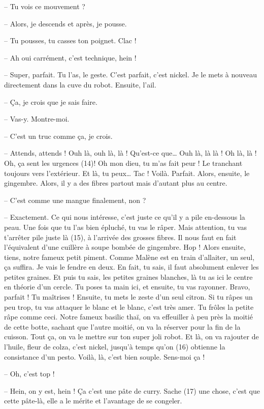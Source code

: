 \documentclass[11pt, french]{report}
\begin{document}
-- Tu vois ce mouvement ?

-- Alors, je descends et après, je pousse.

-- Tu pousses, tu casses ton poignet. Clac !

-- Ah oui carrément, c’est technique, hein !

-- Super, parfait. Tu l’as, le geste. C’est parfait, c’est nickel. Je le mets
à nouveau directement dans la cuve du robot. Ensuite, l’ail.

-- Ça, je crois que je sais faire.

-- Vas-y. Montre-moi.

-- C’est un truc comme ça, je crois.

-- Attends, attends ! Ouh là, ouh là, là ! Qu’est-ce que… Ouh là, là là !
Oh là, là ! Oh, ça sent les urgences (14)! Oh mon dieu, tu m’as fait peur !
Le tranchant toujours vers l’extérieur. Et là, tu peux… Tac ! Voilà. Parfait.
Alors, ensuite, le gingembre. Alors, il y a des fibres partout mais d’autant
plus au centre.

-- C’est comme une mangue finalement, non ?

-- Exactement. Ce qui nous intéresse, c’est juste ce qu’il y a pile en-dessous
la peau. Une fois que tu l’as bien épluché, tu vas le râper. Mais attention, tu
vas t’arrêter pile juste là (15), à l’arrivée des grosses fibres. Il nous faut
en fait l’équivalent d’une cuillère à soupe bombée de gingembre. Hop ! Alors
ensuite, tiens, notre fameux petit piment. Comme Malène est en train d’allaiter,
un seul, ça suffira. Je vais le fendre en deux. En fait, tu sais, il faut
absolument enlever les petites graines. Et puis tu sais, les petites graines
blanches, là tu as ici le centre en théorie d’un cercle. Tu poses ta main ici,
et ensuite, tu vas rayonner. Bravo, parfait ! Tu maîtrises ! Ensuite, tu mets le
zeste d’un seul citron. Si tu râpes un peu trop, tu vas attaquer le blanc et le
blanc, c’est très amer. Tu frôles la petite râpe comme ceci. Notre fameux basilic
thaï, on va effeuiller à peu près la moitié de cette botte, sachant que l’autre
moitié, on va la réserver pour la fin de la cuisson. Tout ça, on va le mettre sur
ton super joli robot. Et là, on va rajouter de l’huile, fleur de colza, c’est
nickel, jusqu’à temps qu’on (16) obtienne la consistance d’un pesto. Voilà, là,
c’est bien souple. Sens-moi ça !

-- Oh, c’est top !

-- Hein, on y est, hein ! Ça c’est une pâte de curry. Sache (17) une chose, c’est
que cette pâte-là, elle a le mérite et l’avantage de se congeler.
\end{document}
